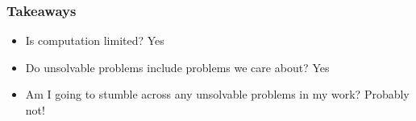 \documentclass[handout, 12pt]{beamer}
\begin{document}
\begin{frame}

\frametitle{Takeaways}

\begin{itemize}
\addtolength{\itemsep}{1\baselineskip}
\pause\item Is computation limited? {\color{r} Yes}
\pause\item Do unsolvable problems include problems we care about? {\color{r} Yes}
\pause\item Am I going to stumble across any unsolvable problems in my work? {\color{r} Probably not!}
\end{itemize}

\end{frame}
\end{document}
